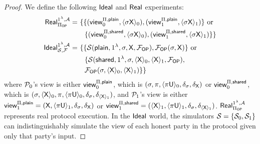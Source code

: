 \begin{proof}
	We define the following $\mathsf{Ideal}$ and $\mathsf{Real}$ experiments:
	\begin{equation*}
			\begin{aligned}
			\real^{1^\lambda,\A}_{\Pi_\ssp}=&\ \{\{(\view_0^{\Pi,\raw},\l\sigma\Xsf\r_0), (\view_1^{\Pi,\raw},\l\sigma\Xsf\r_1)\} \text{ or }\\
			&\ \ \ \{(\view_0^{\Pi,\shared},\l\sigma\Xsf\r_0), (\view_1^{\Pi,\shared},\l\sigma\Xsf\r_1)\}
			\}\\
			\ideal^{1^\lambda, \A}_{\Scal, \F}=&\ \{\{\Scal(\raw,1^\lambda,\sigma,\Xsf,\F_\ssp),\F_\ssp(\sigma,\Xsf)\}\text{ or }\\
			&\ \ \ \{\Scal(\shared,1^\lambda,\sigma,\l\Xsf\r_0,\l\Xsf\r_1,\F_\ssp),
			\\&\quad\F_\ssp(\sigma,\l\Xsf\r_0,\l\Xsf\r_1)\}\}
		\end{aligned}
	\end{equation*}
	where $\mathcal{P}_0$'s view is either $\mathsf{view}_0^{\Pi,\mathsf{plain}}$, which is
	$(\sigma, \pi, \langle \pi\mathsf{U}\rangle_0, \delta_{\sigma}, \delta_{\mathsf{X}})$ or $\mathsf{view}_0^{\Pi,\mathsf{shared}}$,
	which is $(\sigma, \langle \mathsf{X}\rangle_0, \pi, \langle \pi\mathsf{U} \rangle_0, \delta_{\sigma}, \delta_{\langle\mathsf{X}\rangle_1})$,
	and $\mathcal{P}_1$'s view is either $\mathsf{view}_1^{\Pi,\mathsf{plain}}=(\mathsf{X}, \langle \pi\mathsf{U} \rangle_1,\delta_{\sigma},\delta_{\mathsf{X}})$ or $\mathsf{view}_1^{\Pi,\mathsf{shared}}=(\langle\mathsf{X}\rangle_1, \langle \pi\mathsf{U} \rangle_1,\delta_{\sigma},\allowbreak\delta_{\langle\mathsf{X}\rangle_1})$.
	$\mathsf{Real}^{1^\lambda,\mathcal{A}}_{\Pi_{\mathsf{OP}}}$ represents real protocol execution.
	In the $\mathsf{Ideal}$ world, the simulators $\mathcal{S}=\{\mathcal{S}_0,\mathcal{S}_1\}$ can indistinguishably simulate the view of each honest party in the protocol given only that party's input.
 

\end{proof}
